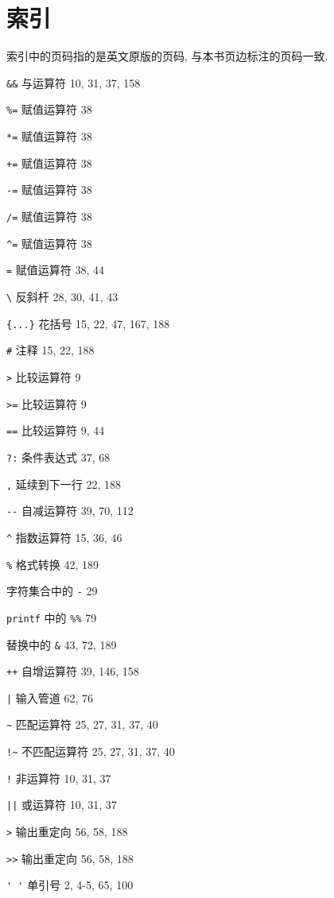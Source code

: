 \chapter{索引}
\label{chap:index}

索引中的页码指的是英文原版的页码, 与本书页边标注的页码一致.

\begin{multicols}{2}

\verb'&&' 与运算符 10, 31, 37, 158

\verb'%=' 赋值运算符 38

\verb'*=' 赋值运算符 38

\verb'+=' 赋值运算符 38

\verb'-=' 赋值运算符 38

\verb'/=' 赋值运算符 38

\verb'^=' 赋值运算符 38

\verb'=' 赋值运算符 38, 44 

\verb'\' 反斜杆 28, 30, 41, 43

\verb'{...}' 花括号 15, 22, 47, 167, 188 

\verb'#' 注释 15, 22, 188 

\verb'>' 比较运算符 9 

\verb'>=' 比较运算符 9 

\verb'==' 比较运算符 9, 44 

\verb'?:' 条件表达式 37, 68 

\verb',' 延续到下一行 22, 188 

\verb'--' 自减运算符 39, 70, 112

\verb'^' 指数运算符 15, 36, 46 

\verb'%' 格式转换 42, 189 

字符集合中的 \verb'-' 29 

\verb'printf' 中的 \verb'%%' 79 

替换中的 \verb'&' 43, 72, 189 

\verb'++' 自增运算符 39, 146, 158 

\verb'|' 输入管道 62, 76

\verb'~' 匹配运算符 25, 27, 31, 37, 40

\verb'!~' 不匹配运算符 25, 27, 31, 37, 40 

\verb'!' 非运算符 10, 31, 37 

\verb'||' 或运算符 10, 31, 37 

\verb'>' 输出重定向 56, 58, 188 

\verb'>>' 输出重定向 56, 58, 188 

\verb"' '" 单引号 2, 4-5, 65, 100 


\end{multicols}
